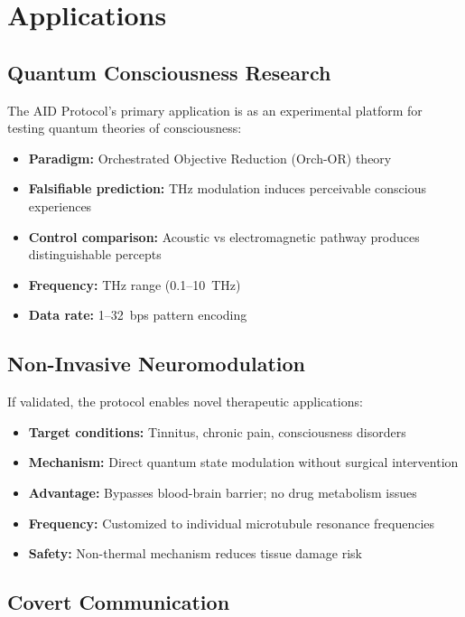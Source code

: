\section{Applications}

\subsection{Quantum Consciousness Research}

The AID Protocol's primary application is as an experimental platform for testing quantum theories of consciousness:

\begin{itemize}
\item \textbf{Paradigm:} Orchestrated Objective Reduction (Orch-OR) theory
\item \textbf{Falsifiable prediction:} THz modulation induces perceivable conscious experiences
\item \textbf{Control comparison:} Acoustic vs electromagnetic pathway produces distinguishable percepts
\item \textbf{Frequency:} THz range (0.1--10~THz)
\item \textbf{Data rate:} 1--32~bps pattern encoding
\end{itemize}

\subsection{Non-Invasive Neuromodulation}

If validated, the protocol enables novel therapeutic applications:

\begin{itemize}
\item \textbf{Target conditions:} Tinnitus, chronic pain, consciousness disorders
\item \textbf{Mechanism:} Direct quantum state modulation without surgical intervention
\item \textbf{Advantage:} Bypasses blood-brain barrier; no drug metabolism issues
\item \textbf{Frequency:} Customized to individual microtubule resonance frequencies
\item \textbf{Safety:} Non-thermal mechanism reduces tissue damage risk
\end{itemize}

\subsection{Covert Communication}

